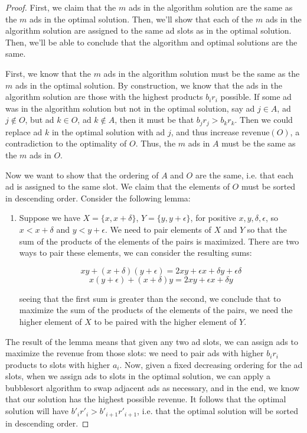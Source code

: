 \documentclass[11pt]{article}
\begin{document}
\begin{enumerate}
\begin{proof}
First, we claim that the $m$ ads in the algorithm solution are the same as the $m$ ads in the optimal solution. Then, we'll show that each of the $m$ ads in the algorithm solution are assigned to the same ad slots as in the optimal solution. Then, we'll be able to conclude that the algorithm and optimal solutions are the same.

First, we know that the $m$ ads in the algorithm solution must be the same as the $m$ ads in the optimal solution. By construction, we know that the ads in the algorithm solution are those with the highest products $b_ir_i$ possible. If some ad was in the algorithm solution but not in the optimal solution, say ad $j \in A$, ad $j \notin O$, but ad $k \in O$, ad $k \notin A$, then it must be that $b_jr_j > b_kr_k$. Then we could replace ad $k$ in the optimal solution with ad $j$, and thus increase $\textrm{revenue}(O)$, a contradiction to the optimality of $O$. Thus, the $m$ ads in $A$ must be the same as the $m$ ads in $O$. 

Now we want to show that the ordering of $A$ and $O$ are the same, i.e. that each ad is assigned to the same slot. %
We claim that the elements of $O$ must be sorted in descending order. Consider the following lemma:

\begin{enumerate}
\item[] Suppose we have $X = \{x, x+\delta\}$, $Y=\{y, y + \epsilon\}$, for positive $x, y, \delta, \epsilon$, so $x < x+\delta$ and $y < y + \epsilon$. We need to pair elements of $X$ and $Y$ so that the sum of the products of the elements of the pairs is maximized. There are two ways to pair these elements, we can consider the resulting sums:

\[ xy + (x+\delta)(y + \epsilon) = 2xy + \epsilon x + \delta y + \epsilon\delta\]
\[ x(y+\epsilon) + (x+\delta)y = 2xy + \epsilon x + \delta y\]

seeing that the first sum is greater than the second, we conclude that to maximize the sum of the products of the elements of the pairs, we need the higher element of $X$ to be paired with the higher element of $Y$. 
\end{enumerate}
The result of the lemma means that given any two ad slots, we can assign ads to maximize the revenue from those slots: we need to pair ads with higher $b_ir_i$ products to slots with higher $a_i$. Now, given a fixed decreasing ordering for the ad slots, when we assign ads to slots in the optimal solution, we can apply a bubblesort algorithm to swap adjacent ads as necessary, and in the end, we know that our solution has the highest possible revenue. It follows that the optimal solution will have $b'_ir'_i > b'_{i+1}r'_{i+1}$, i.e. that the optimal solution will be sorted in descending order. 


\end{proof}
\end{enumerate}
\end{document}
